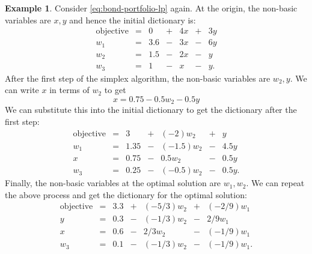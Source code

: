 \documentclass[
]{book}
\theoremstyle{definition}
\theoremstyle{definition}
\newtheorem{example}{Example}[chapter]
\theoremstyle{definition}
\theoremstyle{definition}
\theoremstyle{remark}
\begin{document}
\begin{example}
\protect\hypertarget{exm:dictionaries}{}\label{exm:dictionaries}Consider \eqref{eq:bond-portfolio-lp} again. At the origin, the non-basic variables are \(x, y\) and hence the initial dictionary is:
\begin{equation}
  \begin{array}{rlrrrrr}
  \mbox{objective} & = & 0 & + & 4x & + & 3y \\
  w_1 & = & 3.6 & - & 3x & - & 6y \\
  w_2 & = & 1.5 & - & 2x & - & y \\
  w_3 & = & 1 & - & x & - & y.
  \end{array}
  \label{eq:example-dictionary-1}
\end{equation}
After the first step of the simplex algorithm, the non-basic variables are \(w_2, y\). We can write \(x\) in terms of \(w_2\) to get
\begin{equation*}
  x = 0.75 - 0.5 w_2 - 0.5 y
\end{equation*}
We can substitute this into the initial dictionary to get the dictionary after the first step:
\begin{equation}
  \begin{array}{rlrrrrr}
  \mbox{objective} & = & 3 & + & (-2)w_2 & + & y \\
  w_1 & = & 1.35 & - & (-1.5) w_2 & - & 4.5y \\
  x & = & 0.75 & - & 0.5 w_2 & - & 0.5y \\
  w_3 & = & 0.25 & - & (-0.5) w_2 & - & 0.5y.
  \end{array}
  \label{eq:example-dictionary-2}
\end{equation}
Finally, the non-basic variables at the optimal solution are \(w_1, w_2\).
We can repeat the above process and get the dictionary for the optimal solution:
\begin{equation}
  \begin{array}{rlrrrrr}
  \mbox{objective} & = & 3.3 & + & (-5/3)w_2 & + & (-2/9)w_1 \\
  y & = & 0.3 & - & (-1/3) w_2 & - & 2/9 w_1 \\
  x & = & 0.6 & - & 2/3 w_2 & - & (-1/9) w_1 \\
  w_3 & = & 0.1 & - & (-1/3) w_2 & - & (-1/9) w_1.
  \end{array}
  \label{eq:example-dictionary-3}
\end{equation}
\end{example}
\end{document}
